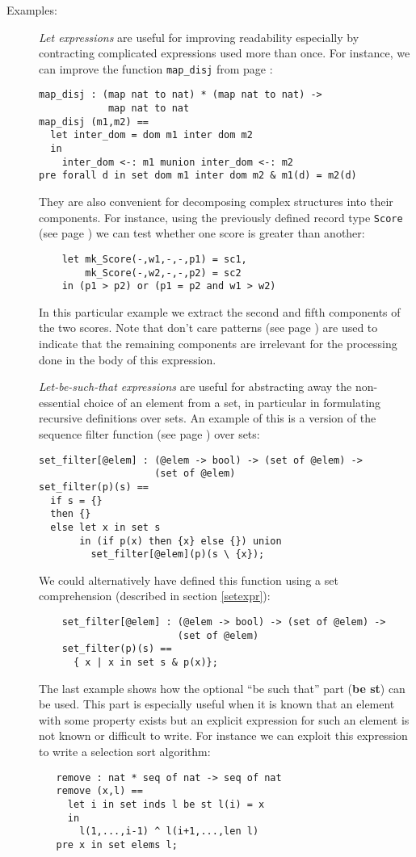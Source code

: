 \documentclass{overturerepchap}
\newcommand{\keyw}[1]{{\bf\ttfamily #1}}
\begin{document}
{\begin{description}
\item[Examples:] {\it Let expressions} are useful for improving
  readability especially by contracting complicated expressions used
  more than once. For instance, we can improve the function
  \texttt{map\_disj} from page \pageref{mapdisj}:
\begin{lstlisting}
map_disj : (map nat to nat) * (map nat to nat) ->
            map nat to nat
map_disj (m1,m2) ==
  let inter_dom = dom m1 inter dom m2
  in
    inter_dom <-: m1 munion inter_dom <-: m2
pre forall d in set dom m1 inter dom m2 & m1(d) = m2(d)
\end{lstlisting}
  They are also convenient for decomposing complex
  structures into their components. For instance, using the previously
  defined record type \texttt{Score} (see page \pageref{scoredef}) we can
  test whether one score is greater than another:
  \begin{lstlisting}
    let mk_Score(-,w1,-,-,p1) = sc1,
        mk_Score(-,w2,-,-,p2) = sc2
    in (p1 > p2) or (p1 = p2 and w1 > w2)
  \end{lstlisting}
  In this
  particular example we extract the second and fifth components of the
  two scores. Note that don't care
  patterns (see page \pageref{patterns}) are used to indicate that the
  remaining components are irrelevant
  for the processing done in the body of this expression.

  {\it Let-be-such-that expressions} are useful for abstracting away
  the non-essential choice of an element from a set, in particular in
  formulating recursive definitions over sets. An example of this is a
  version of the sequence filter function (see page \pageref{filterdef})
  over sets:\label{setfilterdef}
  \begin{lstlisting}
set_filter[@elem] : (@elem -> bool) -> (set of @elem) ->
                    (set of @elem)
set_filter(p)(s) ==
  if s = {}
  then {}
  else let x in set s
       in (if p(x) then {x} else {}) union
         set_filter[@elem](p)(s \ {x});
   \end{lstlisting}
   We could alternatively have defined this function using a set
  comprehension (described in section \ref{setexpr}):
  \begin{lstlisting}
    set_filter[@elem] : (@elem -> bool) -> (set of @elem) ->
                        (set of @elem)
    set_filter(p)(s) ==
      { x | x in set s & p(x)};
  \end{lstlisting}

   The last example shows how the optional ``be such that'' part
   (\keyw{be st}) can be used. This part is especially useful when it
   is known that an element with some property exists but an explicit
   expression for such an element is not known or difficult to
  write. For instance we can exploit this expression to write a
  selection sort algorithm:
   \begin{lstlisting}
   remove : nat * seq of nat -> seq of nat
   remove (x,l) ==
     let i in set inds l be st l(i) = x
     in
       l(1,...,i-1) ^ l(i+1,...,len l)
   pre x in set elems l;


\end{lstlisting}
\end{description}}
\end{document}
